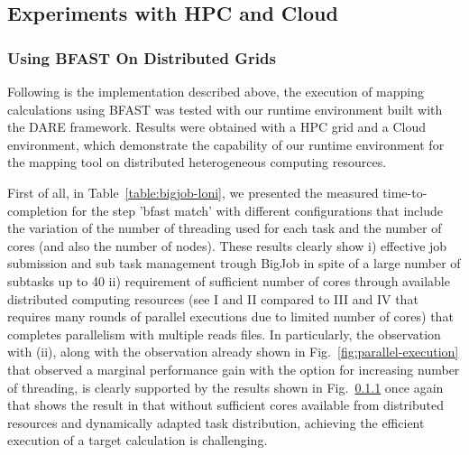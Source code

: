 \documentclass{acm_proc_article-sp}
\begin{document}
\subsection{Experiments with HPC and Cloud}

\subsubsection{Using BFAST On Distributed Grids}

Following is the implementation described above, the execution of mapping calculations using BFAST was tested with our runtime environment built with the DARE framework.   Results were obtained with a HPC grid and a Cloud environment, which demonstrate the capability of our runtime environment for the mapping tool on distributed heterogeneous computing resources.  

First of all, in Table~\ref{table:bigjob-loni}, we presented the measured time-to-completion for the step 'bfast match' with different configurations that include the variation of the number of threading used for each task and the number of cores (and also the number of nodes).   These results clearly show i) effective job submission and sub task management trough BigJob in spite of a large number of subtasks up to 40 ii) requirement of sufficient number of cores through available distributed computing resources (see I and II compared to III and IV that requires many rounds of parallel executions due to limited number of cores) that completes parallelism with multiple reads files.  In particularly, the observation with (ii), along with the observation already shown in Fig.~\ref{fig:parallel-execution} that observed a marginal performance gain with the option for increasing number of threading, is clearly supported by the results shown in Fig.~\ref{} once again that shows the result in that without sufficient cores available from distributed resources and dynamically adapted task distribution, achieving the efficient execution of a target calculation is challenging.
\end{document}
